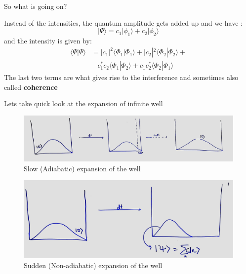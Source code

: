 \documentclass{beamer}
\begin{document}
	\begin{frame}[t]{So what is going on?}
	\begin{flushleft}
	\begin{large}
	Instead of the intensities, the quantum amplitude gets added up and we have :
	\begin{equation}\label{eq:1}
	|\Psi\rangle = c_1|\phi_1\rangle + c_2|\phi_2\rangle
	\end{equation}
	and the intensity is given by:
	\begin{equation}\label{eq:2}
	\begin{split}
	\langle\Psi|\Psi\rangle &= |c_1|^2\langle\Phi_1|\Phi_1\rangle + |c_2|^2\langle\Phi_2|\Phi_2\rangle +\\ & \ \ \ \ c_1^*c_2\langle\Phi_1|\Phi_2\rangle + c_1c_2^*\langle\Phi_2|\Phi_1\rangle
	\end{split}
	\end{equation}
	The last two terms are what gives rise to the interference and sometimes also called \textbf{coherence} 
	\end{large}
	\end{flushleft}
	\end{frame}		
	
	\begin{frame}[t]{Lets take quick look at the expansion of infinite well}
	\begin{figure}
	\includegraphics[scale=0.1]{adiabatic_infinite_well.jpg}
	\caption{Slow (Adiabatic) expansion of the well}
	\end{figure}
	\begin{figure}
	\includegraphics[scale=0.065]{nonadiabatic_infinite_well.jpg}
	\caption{Sudden (Non-adiabatic) expansion of the well}
	\end{figure}
	\end{frame}
	
\end{document}
